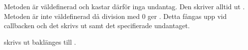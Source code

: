 \Subtask

\Subtask Metoden  är väldefinerad och kastar därför inga undantag. Den skriver alltid ut \code{:)}. Metoden  är inte väldefinerad då division med 0 ger . Detta fångas upp vid callbacken och det skrivs ut \code{:(} samt det specifierade undantaget.

\Task  %

\Task %

\Subtask

\Subtask

\Subtask

\Subtask

\Subtask

\Subtask

\Task %

\Task %

\Subtask {} skrivs ut baklänges till .

\Subtask

\Subtask

\Subtask

\Subtask

\Subtask

\Subtask

\Subtask

\Subtask

\Task %

\Task %

\Task %

\Task %

\Subtask

\Subtask

\Subtask

\Task %

\Subtask

\Subtask

\Subtask

\Subtask
